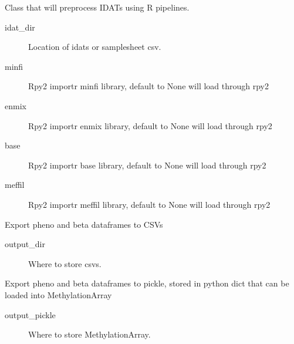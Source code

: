 \documentclass[letterpaper,10pt,english]{sphinxmanual}
\begin{document}
\begin{fulllineitems}
\label{\detokenize{index:pymethylprocess.PreProcessDataTypes.PreProcessIDAT}}
Class that will preprocess IDATs using R pipelines.
\begin{description}
\item[{idat\_dir}] \leavevmode
Location of idats or samplesheet csv.

\item[{minfi}] \leavevmode
Rpy2 importr minfi library, default to None will load through rpy2

\item[{enmix}] \leavevmode
Rpy2 importr enmix library, default to None will load through rpy2

\item[{base}] \leavevmode
Rpy2 importr base library, default to None will load through rpy2

\item[{meffil}] \leavevmode
Rpy2 importr meffil library, default to None will load through rpy2

\end{description}

\begin{fulllineitems}
\label{\detokenize{index:pymethylprocess.PreProcessDataTypes.PreProcessIDAT.export_csv}}
Export pheno and beta dataframes to CSVs
\begin{description}
\item[{output\_dir}] \leavevmode
Where to store csvs.

\end{description}

\end{fulllineitems}


\begin{fulllineitems}
\label{\detokenize{index:pymethylprocess.PreProcessDataTypes.PreProcessIDAT.export_pickle}}
Export pheno and beta dataframes to pickle, stored in python dict that can be loaded into MethylationArray
\begin{description}
\item[{output\_pickle}] \leavevmode
Where to store MethylationArray.


\end{description}
\end{fulllineitems}
\end{fulllineitems}
\end{document}

